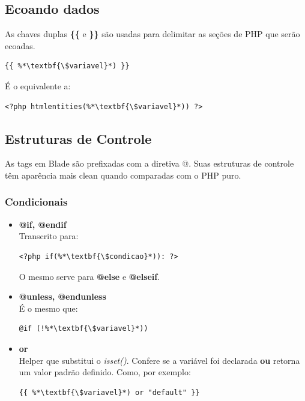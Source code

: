 \documentclass[
12pt,				%
openany,			%
twoside,			%
a4paper,			%
english,			%
french,				%
spanish,			%
brazil,				%
]{abntex2}
\begin{document}
\subsection{Ecoando dados}

As chaves duplas \textbf{\{\{} e \textbf{\}\}} são usadas para delimitar as seções de PHP que serão ecoadas.

\begin{lstlisting}[style=common,caption={Ecoando uma variável}]
    {{ %*\textbf{\$variavel}*) }}
\end{lstlisting}

É o equivalente a:

\begin{lstlisting}[style=common,caption={Ecoando uma variável em PHP puro}]
    <?php htmlentities(%*\textbf{\$variavel}*)) ?> 
\end{lstlisting}

\subsection{Estruturas de Controle}
As tags em Blade são prefixadas com a diretiva @. Suas estruturas de controle têm aparência mais clean quando comparadas com o PHP puro.

\subsubsection{Condicionais}
\begin{itemize}
    \item \textbf{@if, @endif} \\
        Transcrito para:

        \begin{lstlisting}[style=common,caption={Correspondente ao @if em PHP puro}]
    <?php if(%*\textbf{\$condicao}*)): ?>
\end{lstlisting}

O mesmo serve para \textbf{@else} e \textbf{@elseif}.

    \item \textbf{@unless, @endunless} \\

        É o mesmo que:

        \begin{lstlisting}[style=common,caption={Variação do @if}]
    @if (!%*\textbf{\$variavel}*))
\end{lstlisting}

    \item \textbf{or} \\
        Helper que substitui o \textit{isset()}. Confere se a variável foi declarada \textbf{ou} retorna um valor padrão definido. Como, por exemplo:

        \begin{lstlisting}[style=common,caption={Correspondente ao \textit{isset()} em PHP puro}]
    {{ %*\textbf{\$variavel}*) or "default" }}
\end{lstlisting}

\end{itemize}
\end{document}
